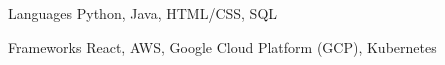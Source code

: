 
\begin{cvskills}
  \cvskill
    {Languages} %
    {Python, Java, HTML/CSS, SQL} %

  \cvskill
    {Frameworks} %
    {React, AWS, Google Cloud Platform (GCP), Kubernetes} %
\end{cvskills}
